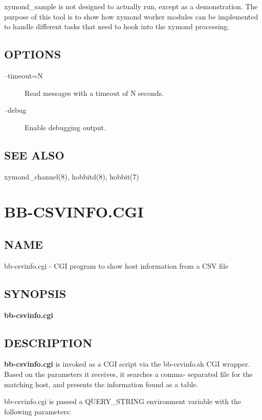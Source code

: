   xymond\_sample is not designed to actually run, except as a
  demonstration. The purpose of this tool is to show how xymond
  worker modules can be implemented to handle different tasks that
  need to hook into the xymond processing. 


 
\subsection{OPTIONS}
\begin{description}
\item[--timeout=N] Read messages with a timeout of N seconds. 

 

\item[--debug] Enable debugging output. 

 


\end{description}
\subsection{SEE ALSO}
xymond\_channel(8), hobbitd(8), hobbit(7) 


%
\newpage
\section{BB-CSVINFO.CGI}
\subsection{NAME}
 bb-csvinfo.cgi - CGI program to show host information from a CSV file \subsection{SYNOPSIS}
\textbf{bb-csvinfo.cgi}


 
\subsection{DESCRIPTION}
\textbf{bb-csvinfo.cgi}
 is invoked as a CGI script via the bb-csvinfo.sh CGI wrapper. Based
 on the parameters it receives, it searches a comma- separated file
 for the matching host, and presents the information found as a
 table. 


  bb-csvinfo.cgi is passed a QUERY\_STRING environment variable with
  the following parameters: 



